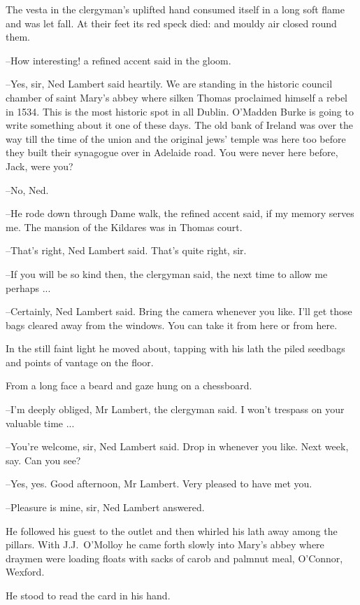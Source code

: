 The vesta in the clergyman's uplifted hand consumed itself
in a long soft
flame and was let fall.
At their feet its red speck died:
and mouldy air
closed round them.

--How interesting!
a refined accent said in the gloom.

--Yes, sir,
Ned Lambert said heartily.
We are standing in the historic
council chamber of saint Mary's abbey
where silken Thomas proclaimed
himself a rebel in 1534.
This is the most historic spot in all Dublin.
O'Madden Burke is going to write something about it
one of these days.
The old bank of Ireland was over the way
till the time of the union
and the
original jews' temple was here too
before they built their synagogue over
in Adelaide road.
You were never here before, Jack, were you?

--No, Ned.

--He rode down through Dame walk,
the refined accent said,
if my
memory serves me.
The mansion of the Kildares was in Thomas court.

--That's right,
Ned Lambert said.
That's quite right, sir.

--If you will be so kind then,
the clergyman said,
the next time to allow
me perhaps ...

--Certainly, Ned Lambert said.
Bring the camera whenever you like.
I'll get those bags cleared away from the windows.
You can take it from here or from here.

In the still faint light
he moved about,
tapping with his lath
the piled
seedbags and points of vantage on the floor.

From a long face
a beard and gaze hung on a chessboard.

--I'm deeply obliged, Mr Lambert,
the clergyman said.
I won't trespass on
your valuable time ...

--You're welcome, sir,
Ned Lambert said.
Drop in whenever you like.
Next
week, say.
Can you see?

--Yes, yes.
Good afternoon, Mr Lambert.
Very pleased to have met you.

--Pleasure is mine, sir,
Ned Lambert answered.

He followed his guest to the outlet
and then whirled his lath away
among the pillars.
With J.J.~O'Molloy he came forth slowly
into Mary's
abbey
where draymen were loading floats with sacks of carob and palmnut
meal,
O'Connor, Wexford.

He stood to read the card in his hand.


